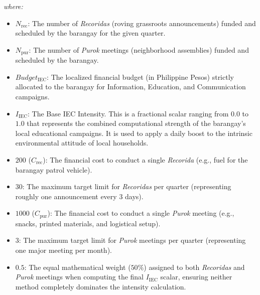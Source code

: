\begin{enumerate}
    \noindent \textit{where:}
    \begin{itemize}
        \item $N_{\text{rec}}$: The number of \textit{Recoridas} (roving grassroots announcements) funded and scheduled by the barangay for the given quarter.
        \item $N_{\text{pur}}$: The number of \textit{Purok} meetings (neighborhood assemblies) funded and scheduled by the barangay.
        \item $Budget_{\text{IEC}}$: The localized financial budget (in Philippine Pesos) strictly allocated to the barangay for Information, Education, and Communication campaigns.
        \item $I_{\text{IEC}}$: The Base IEC Intensity. This is a fractional scalar ranging from $0.0$ to $1.0$ that represents the combined computational strength of the barangay's local educational campaigns. It is used to apply a daily boost to the intrinsic environmental attitude of local households.
        \item $200$ ($C_{\text{rec}}$): The financial cost to conduct a single \textit{Recorida} (e.g., fuel for the barangay patrol vehicle).
        \item $30$: The maximum target limit for \textit{Recoridas} per quarter (representing roughly one announcement every 3 days).
        \item $1000$ ($C_{\text{pur}}$): The financial cost to conduct a single \textit{Purok} meeting (e.g., snacks, printed materials, and logistical setup).
        \item $3$: The maximum target limit for \textit{Purok} meetings per quarter (representing one major meeting per month).
        \item $0.5$: The equal mathematical weight ($50\%$) assigned to both \textit{Recoridas} and \textit{Purok} meetings when computing the final $I_{\text{IEC}}$ scalar, ensuring neither method completely dominates the intensity calculation.
    \end{itemize}


\end{enumerate}
